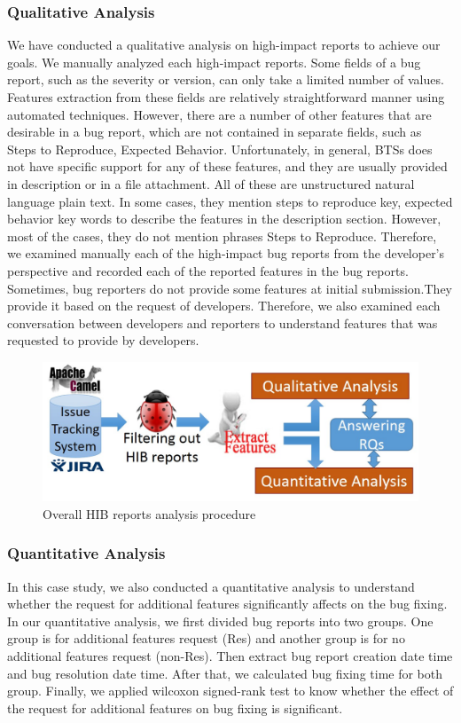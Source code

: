 \documentclass[conference]{IEEEtran}
\begin{document}
 \subsubsection{Qualitative Analysis}
We have conducted a qualitative analysis on high-impact reports to achieve our goals. We manually analyzed each high-impact reports. Some fields of a bug report, such as the severity or version, can only take a limited number of values. Features extraction from these fields are relatively straightforward manner using automated techniques. However, there are a number of other features that are desirable in a bug report, which are not contained in separate fields, such as Steps to Reproduce, Expected Behavior. Unfortunately, in general, BTSs does not have specific support for any of these features, and they are usually provided in description or in a file attachment. All of these are unstructured natural language plain text. In some cases, they mention steps to reproduce key, expected behavior key words to describe the features in the description section. However, most of the cases, they do not mention phrases Steps to Reproduce. Therefore, we examined manually each of the high-impact bug reports from the developer's perspective and recorded each of the reported features in the bug reports. Sometimes, bug reporters do not provide some features at initial submission.They provide it based on the request of developers. Therefore, we also examined each conversation between developers and reporters to understand features that was requested to provide by developers.

 \begin{figure}[t] %
  \begin{center}
    \includegraphics[width=.49\textwidth]{Images/AnalysisP1.jpg}
    \caption{\textsf{Overall HIB reports analysis procedure}}
    \label{fig:AnalP}
  \end{center}
  \end{figure}

\subsubsection{Quantitative Analysis}
In this case study, we also conducted a quantitative analysis to understand whether the request for additional features significantly affects on the bug fixing. In our quantitative analysis, we first divided bug reports into two groups. One group is for additional features request (Res) and another group is for no additional features request (non-Res). Then extract bug report creation date time and bug resolution date time. After that, we calculated bug fixing time for both group. Finally, we applied wilcoxon signed-rank test to know whether the effect of the request for additional features on bug fixing is significant.
\end{document}
